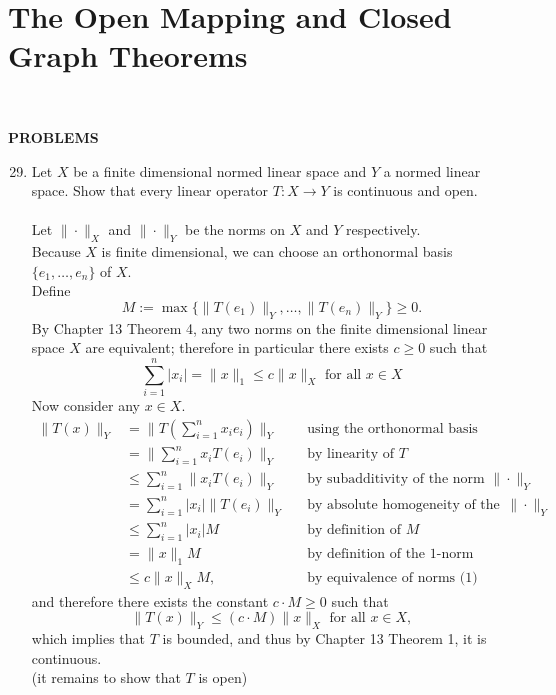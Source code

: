 \section{The Open Mapping and Closed Graph Theorems}\

\begin{center}
	\textbf{PROBLEMS}
\end{center}
\begin{enumerate}
	\setcounter{enumi}{28}
    \item Let $X$ be a finite dimensional normed linear space and $Y$ a normed linear space.
    Show that every linear operator $T:X\to Y$ is continuous and open.\\
    \\Let $\|\cdot\|_X$ and $\|\cdot\|_Y$ be the norms on $X$ and $Y$ respectively.
    \\Because $X$ is finite dimensional, we can choose an orthonormal basis $\{e_1,\dots,e_n\}$ of $X$.
    \\Define 
    \[
        M:=\max\{\|T(e_1)\|_Y,\dots,\|T(e_n)\|_Y\}\ge0.
    \]
    By Chapter 13 Theorem 4, any two norms on the finite dimensional linear space $X$ are equivalent; 
    therefore in particular there exists $c\ge0$ such that
    \[
        \sum_{i=1}^n|x_i|=\|x\|_1\le c\|x\|_X\text{ for all }x\in X\tag{1}
    \] 
    Now consider any $x\in X$.
    \begin{align*}
        \|T(x)\|_Y&=\|T(\sum_{i=1}^nx_ie_i)\|_Y&&\text{using the orthonormal basis}\\
        &=\|\sum_{i=1}^nx_iT(e_i)\|_Y&&\text{by linearity of }T\\
        &\le\sum_{i=1}^n\|x_iT(e_i)\|_Y&&\text{by subadditivity of the norm }\|\cdot\|_Y\\
        &=\sum_{i=1}^n|x_i|\|T(e_i)\|_Y&&\text{by absolute homogeneity of the norm }\|\cdot\|_Y\\
        &\le\sum_{i=1}^n|x_i|M&&\text{by definition of }M\\
        &=\|x\|_1M&&\text{by definition of the 1-norm}\\
        &\le c\|x\|_XM,&&\text{by equivalence of norms (1)}
    \end{align*}
    and therefore there exists the constant $c\cdot M\ge0$ such that 
    \[
        \|T(x)\|_Y\le(c\cdot M)\|x\|_X\text{ for all }x\in X,
    \]
    which implies that $T$ is bounded, and thus by Chapter 13 Theorem 1, it is continuous.
    \\(it remains to show that $T$ is open)

\end{enumerate}
